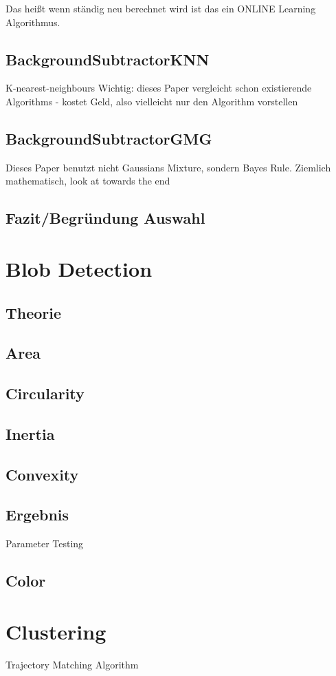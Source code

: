 Das heißt wenn ständig neu berechnet wird ist das ein ONLINE Learning Algorithmus.
\cite{Bowden}
\subsection{BackgroundSubtractorKNN}
K-nearest-neighbours
Wichtig: dieses Paper vergleicht schon existierende Algorithms
- kostet Geld, also vielleicht nur den Algorithm vorstellen
\cite{ZIVKOVIC2006773}
\subsection{BackgroundSubtractorGMG}
Dieses Paper benutzt nicht Gaussians Mixture, sondern Bayes Rule. Ziemlich mathematisch, look at towards the end
\cite{6315174}
\subsection{Fazit/Begründung Auswahl}

\section{Blob Detection}
\subsection{Theorie}
\subsection{Area}
\subsection{Circularity}
\subsection{Inertia}
\subsection{Convexity}
\subsection{Ergebnis}
Parameter Testing
\subsection{Color}


\section{Clustering}
Trajectory Matching Algorithm
